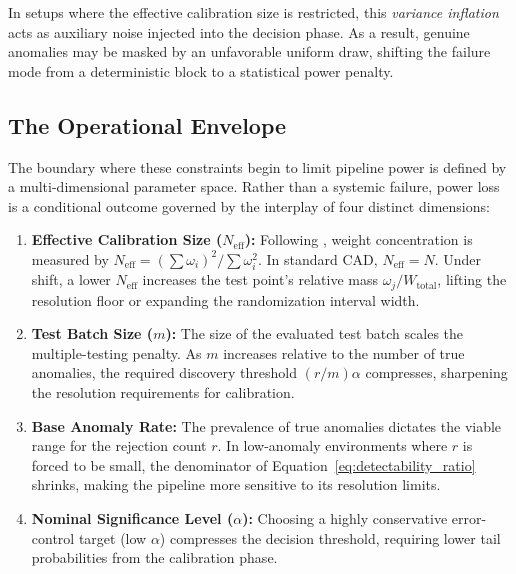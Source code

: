 
In setups where the effective calibration size is restricted, this \textit{variance inflation} acts as auxiliary noise injected into the decision phase. As a result, genuine anomalies may be masked by an unfavorable uniform draw, shifting the failure mode from a deterministic block to a statistical power penalty.

\subsection{The Operational Envelope}
The boundary where these constraints begin to limit pipeline power is defined by a multi-dimensional parameter space. Rather than a systemic failure, power loss is a conditional outcome governed by the interplay of four distinct dimensions:

\begin{enumerate}
    \item \textbf{Effective Calibration Size ($N_{\mathrm{eff}}$):} Following \citet{Kish1965}, weight concentration is measured by $N_{\mathrm{eff}} = (\sum \omega_i)^2 / \sum \omega_i^2$. In standard CAD, $N_{\mathrm{eff}} = N$. Under shift, a lower $N_{\mathrm{eff}}$ increases the test point's relative mass $\omega_j/W_{\mathrm{total}}$, lifting the resolution floor or expanding the randomization interval width.
    \item \textbf{Test Batch Size ($m$):} The size of the evaluated test batch scales the multiple-testing penalty. As $m$ increases relative to the number of true anomalies, the required discovery threshold $(r/m)\alpha$ compresses, sharpening the resolution requirements for calibration.
    \item \textbf{Base Anomaly Rate:} The prevalence of true anomalies dictates the viable range for the rejection count $r$. In low-anomaly environments where $r$ is forced to be small, the denominator of Equation~\eqref{eq:detectability_ratio} shrinks, making the pipeline more sensitive to its resolution limits.
    \item \textbf{Nominal Significance Level ($\alpha$):} Choosing a highly conservative error-control target (low $\alpha$) compresses the decision threshold, requiring lower tail probabilities from the calibration phase.
\end{enumerate}